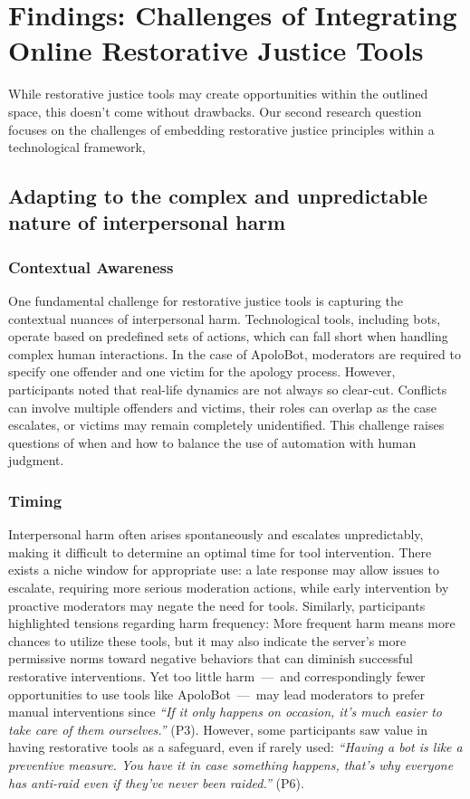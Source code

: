 \section{Findings: Challenges of Integrating Online Restorative Justice Tools} \label{findings2}
While restorative justice tools may create opportunities within the outlined space, this doesn't come without drawbacks. Our second research question focuses on the challenges of embedding restorative justice principles within a technological framework, 

\subsection{Adapting to the complex and unpredictable nature of interpersonal harm} 
\subsubsection{Contextual Awareness}
One fundamental challenge for restorative justice tools is capturing the contextual nuances of interpersonal harm. Technological tools, including bots, operate based on predefined sets of actions, which can fall short when handling complex human interactions. In the case of ApoloBot, moderators are required to specify one offender and one victim for the apology process. However, participants noted that real-life dynamics are not always so clear-cut. Conflicts can involve multiple offenders and victims, their roles can overlap as the case escalates, or victims may remain completely unidentified. This challenge raises questions of when and how to balance the use of automation with human judgment. 

\subsubsection{Timing} Interpersonal harm often arises spontaneously and escalates unpredictably, making it difficult to determine an optimal time for tool intervention. There exists a niche window for appropriate use: a late response may allow issues to escalate, requiring more serious moderation actions, while early intervention by proactive moderators may negate the need for tools. Similarly, participants highlighted tensions regarding harm frequency: More frequent harm means more chances to utilize these tools, but it may also indicate the server's more permissive norms toward negative behaviors that can diminish successful restorative interventions. Yet too little harm~---~and correspondingly fewer opportunities to use tools like ApoloBot~---~may lead moderators to prefer manual interventions since \textit{``If it only happens on occasion, it's much easier to take care of them ourselves.'' }(P3). However, some participants saw value in having restorative tools as a safeguard, even if rarely used: \textit{``Having a bot is like a preventive measure. You have it in case something happens, that's why everyone has anti-raid even if they've never been raided.''} (P6). 

